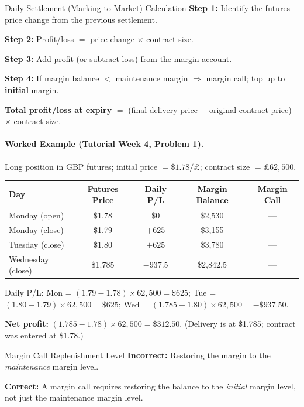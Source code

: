 \documentclass[11pt,a4paper]{article}
\begin{document}
\begin{methodbox}{Daily Settlement (Marking-to-Market) Calculation}
\textbf{Step 1:} Identify the futures price change from the previous settlement.

\textbf{Step 2:} Profit/loss $=$ price change $\times$ contract size.

\textbf{Step 3:} Add profit (or subtract loss) from the margin account.

\textbf{Step 4:} If margin balance $<$ maintenance margin $\Rightarrow$ margin call; top up to \textbf{initial} margin.

\textbf{Total profit/loss at expiry} $=$ (final delivery price $-$ original contract price) $\times$ contract size.
\end{methodbox}

\paragraph{Worked Example (Tutorial Week 4, Problem 1).}

Long position in GBP futures; initial price $= \$1.78/\text{£}$; contract size $= £62{,}500$.

\begin{center}
\begin{tabular}{lcccc}
\toprule
Day & Futures Price & Daily P/L & Margin Balance & Margin Call \\
\midrule
Monday (open) & \$1.78 & \$0 & \$2,530 & --- \\
Monday (close) & \$1.79 & $+625$ & \$3,155 & --- \\
Tuesday (close) & \$1.80 & $+625$ & \$3,780 & --- \\
Wednesday (close) & \$1.785 & $-937.5$ & \$2,842.5 & --- \\
\bottomrule
\end{tabular}
\end{center}

Daily P/L: Mon = $(1.79 - 1.78) \times 62{,}500 = \$625$; Tue = $(1.80 - 1.79) \times 62{,}500 = \$625$; Wed = $(1.785 - 1.80) \times 62{,}500 = -\$937.50$.

\textbf{Net profit:} $(1.785 - 1.78) \times 62{,}500 = \$312.50$. (Delivery is at \$1.785; contract was entered at \$1.78.)

\begin{mistakebox}{Margin Call Replenishment Level}
\textbf{Incorrect:} Restoring the margin to the \textit{maintenance} margin level.

\textbf{Correct:} A margin call requires restoring the balance to the \textit{initial} margin level, not just the maintenance margin level.
\end{mistakebox}
\end{document}
